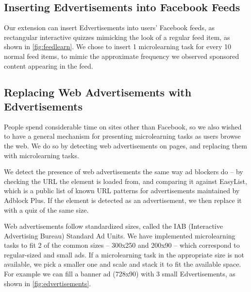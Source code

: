 \documentclass{sigchi}
\begin{document}


\subsection{Inserting Edvertisements into Facebook Feeds}

Our extension can insert Edvertisements into users' Facebook feeds, as rectangular interactive quizzes mimicking the look of a regular feed item, as shown in \autoref{fig:feedlearn}. We chose to insert 1 microlearning task for every 10 normal feed items, to mimic the approximate frequency we observed sponsored content appearing in the feed.

\subsection{Replacing Web Advertisements with Edvertisements}

People spend considerable time on sites other than Facebook, so we also wished to have a general mechanism for presenting microlearning tasks as users browse the web. We do so by detecting web advertisements on pages, and replacing them with microlearning tasks.

We detect the presence of web advertisements the same way ad blockers do -- by checking the URL the element is loaded from, and comparing it against EasyList, which is a public list of known URL patterns for advertisements maintained by Adblock Plus. If the element is detected as an advertisement, we then replace it with a quiz of the same size.

Web advertisements follow standardized sizes, called the IAB (Interactive Advertising Bureau) Standard Ad Units.
We have implemented microlearning tasks to fit 2 of the common sizes -- 300x250 and 200x90 -- which correspond to regular-sized and small ads.  If a microlearning task in the appropriate size is not available, we pick a smaller one and scale and stack it to fit the available space. For example we can fill a banner ad (728x90) with 3 small Edvertisements, as shown in \autoref{fig:edvertisements}. %

\end{document}
